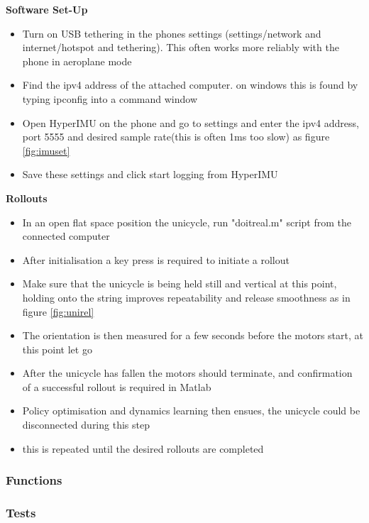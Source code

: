 \documentclass[twoside,twocolumn,12pt]{article}
\begin{document}
\textbf{Software Set-Up}
\begin{itemize}
\item Turn on USB tethering in the phones settings (settings/network and internet/hotspot and tethering). This often works more reliably with the phone in aeroplane mode
\item Find the ipv4 address of the attached computer. on windows this is found by typing ipconfig into a command window
\item Open HyperIMU on the phone and go to settings and enter the ipv4 address, port 5555 and desired sample rate(this is often 1ms too slow) as figure \ref{fig:imuset}
\item Save these settings and click start logging from HyperIMU
\end{itemize}
\textbf{Rollouts}
\begin{itemize}
\item In an open flat space position the unicycle, run "doitreal.m" script from the connected computer
\item After initialisation a key press is required to initiate a rollout
\item Make sure that the unicycle is being held still and vertical at this point, holding onto the string improves repeatability and release smoothness as in figure \ref{fig:unirel}
\item The orientation is then measured for a few seconds before the motors start, at this point let go
\item After the unicycle has fallen the motors should terminate, and confirmation of a successful rollout is required in Matlab 
\item Policy optimisation and dynamics learning then ensues, the unicycle could be disconnected during this step
\item this is repeated until the desired rollouts are completed
\end{itemize}

\twocolumn
\subsubsection{Functions}



\subsubsection{Tests}
\end{document}
